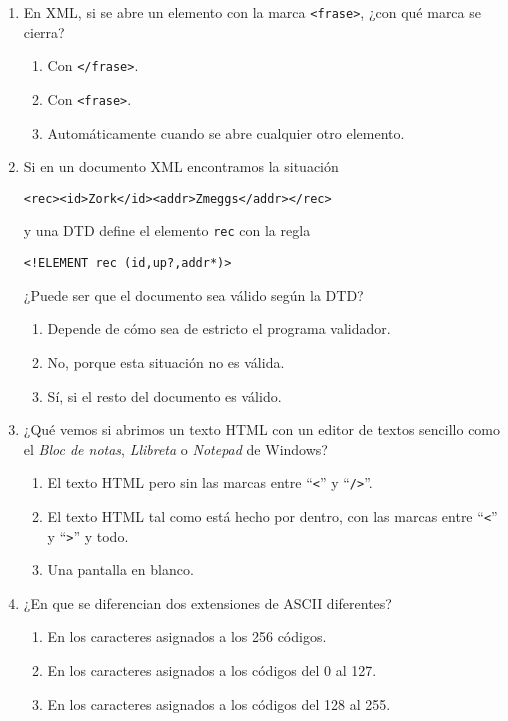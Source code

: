 {\begin{enumerate}
\item En XML, si se abre un elemento con la marca \verb|<frase>|, ¿con qué marca se cierra? \begin{enumerate} \item Con \verb|</frase>|. \item Con \verb|<frase>|. \item Automáticamente cuando se abre cualquier otro elemento. \end{enumerate} 

\item Si en un documento XML encontramos la situación \begin{center}\verb|<rec><id>Zork</id><addr>Zmeggs</addr></rec>|\end{center} y una DTD define el elemento \verb|rec| con la regla \begin{center}\verb|<!ELEMENT rec (id,up?,addr*)>|\end{center} ¿Puede ser que el documento sea válido según la DTD? \begin{enumerate} \item Depende de cómo sea de estricto el programa validador. \item No, porque esta situación no es válida. \item Sí, si el resto del documento es válido. \end{enumerate} 

\item ¿Qué vemos si abrimos un texto HTML con un editor de textos sencillo como el \emph{Bloc de notas}, \emph{Llibreta} o  \emph{Notepad} de Windows? \begin{enumerate} \item El texto HTML pero sin las marcas entre ``\verb|<|'' y ``\verb|/>|''. \item El texto HTML tal como está hecho por dentro, con las marcas entre ``\verb|<|'' y ``\verb|>|'' y todo. \item Una pantalla en blanco. \end{enumerate} 

\item ¿En que se diferencian dos extensiones de ASCII diferentes? \begin{enumerate} \item En los caracteres asignados a los 256 códigos. \item En los caracteres asignados a los códigos del 0 al 127. \item En los caracteres asignados a los códigos del 128 al 255. \end{enumerate} 


\end{enumerate}}

